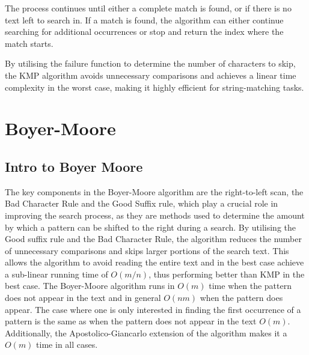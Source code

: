 The process continues until either a complete match is found, or if there is no text left to search in. If a match is found, the algorithm can either continue searching for additional occurrences or stop and return the index where the match starts.

By utilising the failure function to determine the number of characters to skip, the KMP algorithm avoids unnecessary comparisons and achieves a linear time complexity in the worst case, making it highly efficient for string-matching tasks.

\section{Boyer-Moore}

\subsection{Intro to Boyer Moore}
The key components in the Boyer-Moore algorithm are the right-to-left scan, the Bad Character Rule and the Good Suffix rule, which play a crucial role in improving the search process, as they are methods used to determine the amount by which a pattern can be shifted to the right during a search. By utilising the Good suffix rule and the Bad Character Rule, the algorithm reduces the number of unnecessary comparisons and skips larger portions of the search text. This allows the algorithm to avoid reading the entire text and in the best case achieve a sub-linear running time of $O(m/n)$, thus performing better than KMP in the best case. The Boyer-Moore algorithm runs in $O(m)$ time when the pattern does not appear in the text and in general $O(nm)$ when the pattern does appear. The case where one is only interested in finding the first occurrence of a pattern is the same as when the pattern does not appear in the text $O(m)$. Additionally, the Apostolico-Giancarlo extension of the algorithm makes it a $O(m)$ time in all cases. 

